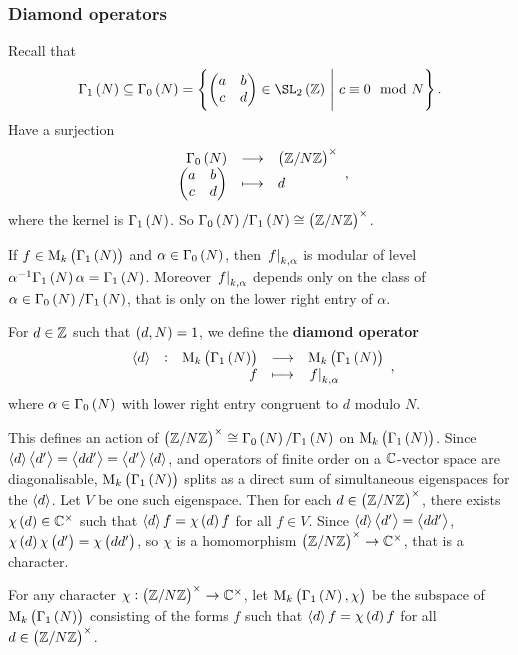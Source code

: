\subsubsection{Diamond operators}


Recall that
$$ \Gamma_1\br{N} \subseteq \Gamma_0\br{N} = \cbr{\twobytwo{a}{b}{c}{d} \in \SL_2\br{\ZZ} \st c \equiv 0 \mod N}. $$
Have a surjection
$$ \function{\Gamma_0\br{N}}{\br{\ZZ / N\ZZ}^\times}{\twobytwo{a}{b}{c}{d}}{d}, $$
where the kernel is $ \Gamma_1\br{N} $. So $ \Gamma_0\br{N} / \Gamma_1\br{N} \cong \br{\ZZ / N\ZZ}^\times $.

\begin{note*}
If $ f \in \M_k\br{\Gamma_1\br{N}} $ and $ \alpha \in \Gamma_0\br{N} $, then $ \left. f \right|_{k, \alpha} $ is modular of level $ \alpha^{-1}\Gamma_1\br{N}\alpha = \Gamma_1\br{N} $. Moreover $ \left. f \right|_{k, \alpha} $ depends only on the class of $ \alpha \in \Gamma_0\br{N} / \Gamma_1\br{N} $, that is only on the lower right entry of $ \alpha $.
\end{note*}

\begin{definition}
For $ d \in \mathbb{Z} $ such that $ \br{d, N} = 1 $, we define the \textbf{diamond operator}
$$ \function[\abr{d}]{\M_k\br{\Gamma_1\br{N}}}{\M_k\br{\Gamma_1\br{N}}}{f}{\eval{f}_{k, \alpha}}, $$
where $ \alpha \in \Gamma_0\br{N} $ with lower right entry congruent to $ d $ modulo $ N $.
\end{definition}

This defines an action of $ \br{\ZZ / N\ZZ}^\times \cong \Gamma_0\br{N} / \Gamma_1\br{N} $ on $ \M_k\br{\Gamma_1\br{N}} $. Since $ \left\langle d \right\rangle\left\langle d' \right\rangle = \left\langle dd' \right\rangle = \left\langle d' \right\rangle\left\langle d \right\rangle $, and operators of finite order on a $ \mathbb{C} $-vector space are diagonalisable, $ \M_k\br{\Gamma_1\br{N}} $ splits as a direct sum of simultaneous eigenspaces for the $ \left\langle d \right\rangle $. Let $ V $ be one such eigenspace. Then for each $ d \in \br{\ZZ / N\ZZ}^\times $, there exists $ \chi\br{d} \in \CC^\times $ such that $ \abr{d}f = \chi\br{d}f $ for all $ f \in V $. Since $ \left\langle d \right\rangle\left\langle d' \right\rangle = \left\langle dd' \right\rangle $, $ \chi\br{d}\chi\br{d'} = \chi\br{dd'} $, so $ \chi $ is a homomorphism $ \br{\ZZ / N\ZZ}^\times \to \CC^\times $, that is a character.

\begin{definition}
For any character $ \chi : \br{\ZZ / N\ZZ}^\times \to \CC^\times $, let $ \M_k\br{\Gamma_1\br{N}, \chi} $ be the subspace of $ \M_k\br{\Gamma_1\br{N}} $ consisting of the forms $ f $ such that $ \abr{d}f = \chi\br{d}f $ for all $ d \in \br{\ZZ / N\ZZ}^\times $.
\end{definition}

